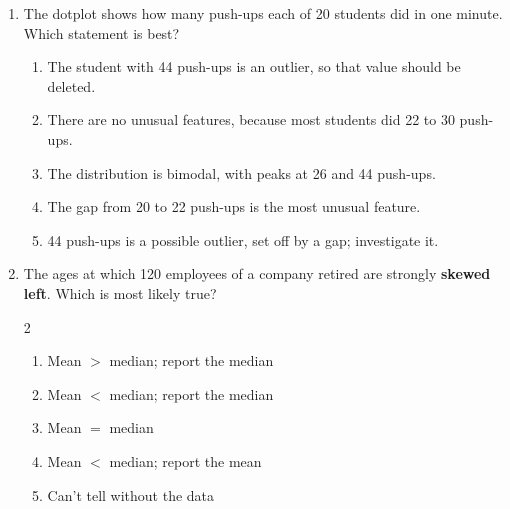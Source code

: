 \documentclass[12pt]{article}
\newenvironment{choices}
  {\begin{enumerate}[label=\textbf{(\Alph*)}, leftmargin=2.2em, itemsep=0pt, topsep=1pt]}
  {\end{enumerate}}
\newcommand{\letterroom}{\rule[-15pt]{0pt}{36pt}}
\begin{document}
\begin{enumerate}[leftmargin=1.9em, itemsep=0.03in]
  \boxguard[11]
  \item \begin{minipage}[t]{0.56\linewidth}\raggedright
        The dotplot shows how many push-ups each of 20 students did in one minute. Which
        statement is best?
        \end{minipage}\hfill
        \begin{minipage}[t]{0.40\linewidth}
        \centering
        \end{minipage}
        \begin{choices}
          \item The student with 44 push-ups is an outlier, so that value should be deleted.
          \item There are no unusual features, because most students did 22 to 30 push-ups.
          \item The distribution is bimodal, with peaks at 26 and 44 push-ups.
          \item The gap from 20 to 22 push-ups is the most unusual feature.
          \item 44 push-ups is a possible outlier, set off by a gap; investigate it.
                \hfill{}\letterroom
        \end{choices}

  \boxguard[10]
  \item The ages at which 120 employees of a company retired are strongly \textbf{skewed left}.
        Which is most likely true?\hfill{}\letterroom
        \begin{multicols}{2}
        \begin{choices}
          \item Mean $>$ median; report the median
          \item Mean $<$ median; report the median
          \item Mean $=$ median
          \item Mean $<$ median; report the mean
          \item Can't tell without the data
        \end{choices}
        \end{multicols}


\end{enumerate}
\end{document}
